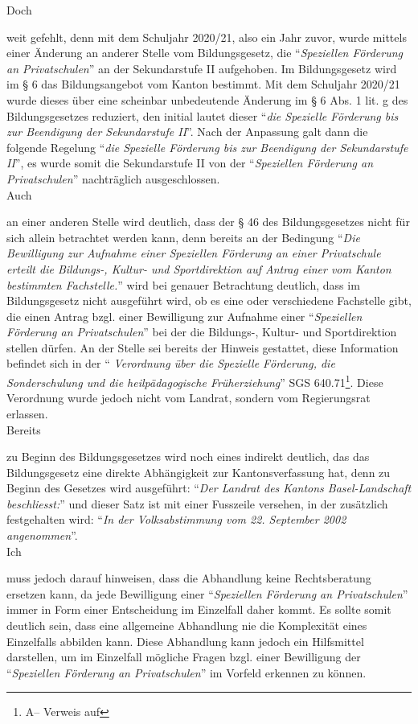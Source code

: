 \documentclass[10pt,parskip]{scrbook}
\newcounter{rz}
\newcommand{\Rz}{\addtocounter{rz}{1}\marginpar{\texttt{\textit{A\arabic{rz}}}}}
\newif\ifFooterInfo
\newcommand{\GNorm}[3]{#1 #2\ifFooterInfo\footnote{A\therz -- Verweis auf \ifstrempty{#3}{\citefield{#1#2}{title}}{\citefield{#1#3}{title}}}}
\begin{document}
Doch \Rz weit gefehlt, denn mit dem Schuljahr  2020/21, also ein Jahr zuvor, wurde mittels einer Änderung an anderer Stelle vom Bildungsgesetz, die "`\textsl{Speziellen Förderung an Privatschulen}"' an der Sekundarstufe II aufgehoben. Im Bildungsgesetz wird im § 6 das Bildungsangebot vom Kanton bestimmt. Mit dem Schuljahr 2020/21 wurde dieses über eine scheinbar unbedeutende Änderung im § 6 Abs. 1 lit. g des Bildungsgesetzes reduziert, den initial lautet dieser "`\textsl{die Spezielle Förderung bis zur Beendigung der Sekundarstufe II}"'. Nach der Anpassung galt dann die folgende Regelung "`\textsl{die Spezielle Förderung bis zur Beendigung der Sekundarstufe II}"', es wurde somit die Sekundarstufe II von der "`\textsl{Speziellen Förderung an Privatschulen}"' nachträglich ausgeschlossen.\\ 

Auch \Rz an einer anderen Stelle wird deutlich, dass der § 46 des Bildungsgesetzes nicht für sich allein betrachtet werden kann, denn bereits an der Bedingung "`\textit{Die Bewilligung zur Aufnahme einer Speziellen Förderung an einer Privatschule erteilt die Bildungs-, Kultur- und Sportdirektion auf Antrag einer vom Kanton bestimmten Fachstelle.}"' wird bei genauer Betrachtung deutlich, dass im Bildungsgesetz nicht ausgeführt wird, ob es eine oder verschiedene Fachstelle gibt, die einen Antrag bzgl. einer Bewilligung zur Aufnahme einer "`\textsl{Speziellen Förderung an Privatschulen}"' bei der die Bildungs-, Kultur- und Sportdirektion stellen dürfen. An der Stelle sei bereits der Hinweis gestattet, diese Information befindet sich in der "`\textsl{ Verordnung über die Spezielle Förderung, die Sonderschulung und die heilpädagogische Früherziehung}"' \GNorm{SGS}{640.71}{64071}. Diese Verordnung wurde jedoch nicht vom Landrat, sondern vom Regierungsrat erlassen.\\

Bereits \Rz zu Beginn des Bildungsgesetzes wird noch eines indirekt deutlich, das das Bildungsgesetz eine direkte Abhängigkeit zur Kantonsverfassung hat, denn zu Beginn des Gesetzes wird ausgeführt: "`\textsl{Der Landrat des Kantons Basel-Landschaft beschliesst:}"' und dieser Satz ist mit einer Fusszeile versehen, in der zusätzlich festgehalten wird: "`\textsl{In der Volksabstimmung vom 22. September 2002 angenommen}"'.\\


Ich \Rz muss jedoch darauf hinweisen, dass die Abhandlung keine Rechtsberatung ersetzen kann, da jede Bewilligung einer "`\textsl{Speziellen Förderung an Privatschulen}"' immer in Form einer Entscheidung im Einzelfall daher kommt. Es sollte somit deutlich sein, dass eine allgemeine Abhandlung nie die Komplexität eines Einzelfalls abbilden kann. Diese Abhandlung kann jedoch ein Hilfsmittel darstellen, um im Einzelfall mögliche Fragen bzgl. einer Bewilligung der "`\textsl{Speziellen Förderung an Privatschulen}"' im Vorfeld erkennen zu können.
\end{document}
